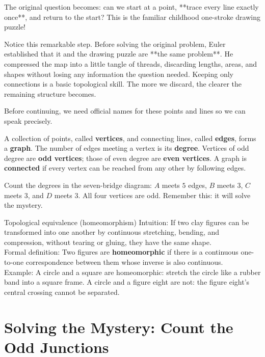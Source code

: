 The original question becomes: can we start at a point, **trace every line exactly once**, and return to the start? This is the familiar childhood one-stroke drawing puzzle!

Notice this remarkable step. Before solving the original problem, Euler established that it and the drawing puzzle are **the same problem**. He compressed the map into a little tangle of threads, discarding lengths, areas, and shapes without losing any information the question needed. Keeping only connections is a basic topological skill. The more we discard, the clearer the remaining structure becomes.

Before continuing, we need official names for these points and lines so we can speak precisely.

\begin{dingyi}
A collection of points, called \textbf{vertices}, and connecting lines, called \textbf{edges}, forms a \textbf{graph}. The number of edges meeting a vertex is its \textbf{degree}. Vertices of odd degree are \textbf{odd vertices}; those of even degree are \textbf{even vertices}. A graph is \textbf{connected} if every vertex can be reached from any other by following edges.
\end{dingyi}

Count the degrees in the seven-bridge diagram: $A$ meets $5$ edges, $B$ meets $3$, $C$ meets $3$, and $D$ meets $3$. All four vertices are odd. Remember this: it will solve the mystery.

\begin{shuyu}{Topological equivalence (homeomorphism)}
Intuition: If two clay figures can be transformed into one another by continuous stretching, bending, and compression, without tearing or gluing, they have the same shape.\\
Formal definition: Two figures are \textbf{homeomorphic} if there is a continuous one-to-one correspondence between them whose inverse is also continuous.\\
Example: A circle and a square are homeomorphic: stretch the circle like a rubber band into a square frame. A circle and a figure eight are not: the figure eight's central crossing cannot be separated.
\end{shuyu}

\section{Solving the Mystery: Count the Odd Junctions}

